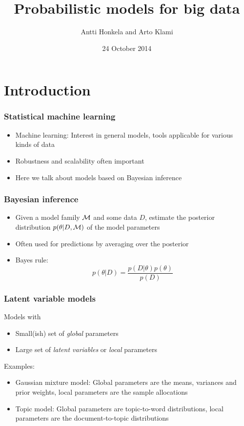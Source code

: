\documentclass{beamer}
\title{Probabilistic models for big data}
\author{Antti Honkela and Arto Klami}
\date{24 October 2014}
\begin{document}
\frame{\titlepage}


\section{Introduction}

\begin{frame}
  \frametitle{Statistical machine learning}

  \begin{itemize}
  \item Machine learning: Interest in general models, tools applicable
    for various kinds of data
  \item Robustness and scalability often important
  \item Here we talk about models based on Bayesian inference
  \end{itemize}
\end{frame}

\begin{frame}
  \frametitle{Bayesian inference}

  \begin{itemize}
  \item Given a model family ${\cal M}$ and some data $D$, estimate
    the posterior distribution $p(\theta|D,{\cal M})$ of the model
    parameters
  \item Often used for predictions by averaging over the posterior
  \item Bayes rule:
    \[
    p(\theta|D) = \frac{p(D|\theta)p(\theta)}{p(D)}
    \]
  \end{itemize}
\end{frame}

\begin{frame}
  \frametitle{Latent variable models}

  Models with
  \begin{itemize}
  \item Small(ish) set of \emph{global} parameters
  \item Large set of \emph{latent variables} or \emph{local} parameters
  \end{itemize}

  Examples:
  \begin{itemize}
  \item Gaussian mixture model: Global parameters are the means,
    variances and prior weights, local parameters are the sample
    allocations
  \item Topic model: Global parameters are topic-to-word distributions,
    local parameters are the document-to-topic distributions
  \end{itemize}
\end{frame}
\end{document}
